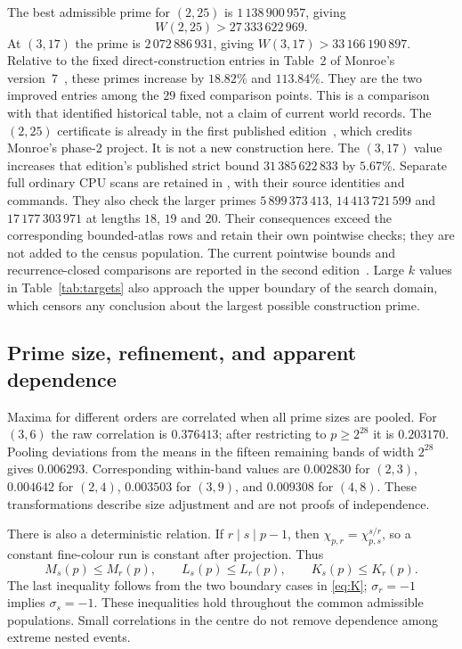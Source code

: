 \documentclass[11pt]{article}
\theoremstyle{definition}\newtheorem{definition}[theorem]{Definition}
\begin{document}
The best admissible prime for $(2,25)$ is $1\,138\,900\,957$, giving
\[
 W(2,25)>27\,333\,622\,969.
\]
At $(3,17)$ the prime is $2\,072\,886\,931$, giving
$W(3,17)>33\,166\,190\,897$. Relative to the fixed direct-construction
entries in Table~2 of Monroe's version~7~\cite{monroev7}, these primes
increase by $18.82\%$ and $113.84\%$. They are the two improved entries
among the $29$ fixed comparison points. This is a comparison with that
identified historical table, not a claim of current world records.
The $(2,25)$ certificate is already in the first published edition~\cite{bounds},
which credits Monroe's phase-2 project. It is not a new construction here.
The $(3,17)$ value increases that edition's published strict bound
$31\,385\,622\,833$ by $5.67\%$. Separate full ordinary CPU scans
are retained in , with
their source identities and commands. They also check the larger primes
$5\,899\,373\,413$, $14\,413\,721\,599$ and $17\,177\,303\,971$
at lengths $18$, $19$ and $20$. Their consequences exceed the
corresponding bounded-atlas rows and retain their own pointwise checks;
they are not added to the census population. The current pointwise bounds
and recurrence-closed comparisons are reported in the second edition~\cite{boundsv2}.
Large $k$ values in Table~\ref{tab:targets} also approach the upper
boundary of the search domain, which censors any conclusion about the
largest possible construction prime.

\subsection{Prime size, refinement, and apparent dependence}
Maxima for different orders are correlated when all prime sizes are
pooled. For $(3,6)$ the raw correlation is $0.376413$; after restricting
to $p\ge2^{28}$ it is $0.203170$. Pooling deviations from the means in
the fifteen remaining bands of width $2^{28}$ gives $0.006293$.
Corresponding within-band values are $0.002830$ for $(2,3)$,
$0.004642$ for $(2,4)$, $0.003503$ for $(3,9)$, and $0.009308$ for
$(4,8)$. These transformations describe size adjustment and are not
proofs of independence.

There is also a deterministic relation. If $r\mid s\mid p-1$, then
$\chi_{p,r}=\chi_{p,s}^{s/r}$, so a constant fine-colour run is constant
after projection. Thus
\[
 M_s(p)\le M_r(p),\qquad L_s(p)\le L_r(p),\qquad K_s(p)\le K_r(p).
\]
The last inequality follows from the two boundary cases in
\eqref{eq:K}; $\sigma_r=-1$ implies $\sigma_s=-1$. These inequalities
hold throughout the common admissible populations. Small correlations
in the centre do not remove dependence among extreme nested events.
\end{document}
